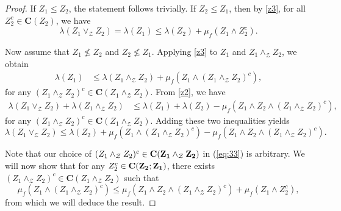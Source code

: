 \documentclass[a4paper,11pt,reqno]{article}
\theoremstyle{definition}
\newcommand{\mZ}{\mathcal{Z}}
\newcommand{\cC}{\textup{\bf{C}}}
\begin{document}
\begin{proof}
    If $Z_1\leq Z_2$, the statement follows trivially. If $Z_2\leq Z_1$, then by \ref{z3}, for all $Z_2^c\in\mathbf{C}(Z_2)$, we have
    \[
    \lambda(Z_1\vee_\mathcal{Z} Z_2) = \lambda(Z_1) \leq \lambda(Z_2) + \mu_f(Z_1\wedge Z_2^c).
    \]
    
    Now assume that $Z_1\nleq Z_2$ and $Z_2\nleq Z_1$.
    Applying \ref{z3} to $Z_1$ and $Z_1 \wedge_\mZ Z_2$, we obtain
    \begin{align*}
        \lambda(Z_1)&\leq\lambda(Z_1\wedge_\mathcal{Z} Z_2)+\mu_f(Z_1\wedge(Z_1\wedge_\mathcal{Z} Z_2)^c),
    \end{align*}
    for any $(Z_1\wedge_\mathcal{Z} Z_2)^c\in\mathbf{C}(Z_1\wedge_\mathcal{Z}Z_2)$.
    From \ref{z2}, we have
    \begin{align*}
        \lambda(Z_1\vee_\mathcal{Z} Z_2)+\lambda(Z_1\wedge_\mathcal{Z} Z_2) &\leq \lambda(Z_1)+\lambda(Z_2)-\mu_f(Z_1\wedge Z_2\wedge (Z_1\wedge_\mathcal{Z} Z_2)^c),
    \end{align*}
    for any $(Z_1\wedge_\mathcal{Z} Z_2)^c\in\mathbf{C}(Z_1\wedge_\mathcal{Z}Z_2)$.
    Adding these two inequalities yields
    \begin{equation}\label{eq:33}
         \lambda(Z_1\vee_\mathcal{Z} Z_2) \leq \lambda(Z_2) + \mu_f(Z_1\wedge(Z_1\wedge_\mathcal{Z} Z_2)^c) - \mu_f(Z_1\wedge Z_2\wedge (Z_1\wedge_\mathcal{Z} Z_2)^c).
    \end{equation}

    Note that our choice of $(Z_1\wedge_\mathcal{Z}Z_2)^c\in\cC(Z_1 \wedge_\mZ Z_2)$ in (\ref{eq:33}) is arbitrary.
    We will now show that for any $Z_2^c \in \cC(Z_2;Z_1)$, there exists $(Z_1\wedge_\mathcal{Z}Z_2)^c\in\mathbf{C}(Z_1\wedge_\mathcal{Z}Z_2)$ such that 
    \begin{equation}\label{eq:late_mu_ineq}
        \mu_f(Z_1\wedge(Z_1\wedge_\mathcal{Z} Z_2)^c) \leq \mu_f(Z_1\wedge Z_2\wedge (Z_1\wedge_\mathcal{Z} Z_2)^c) + \mu_f(Z_1\wedge Z_2^c),
    \end{equation}
    from which we will deduce the result.


\end{proof}
\end{document}

